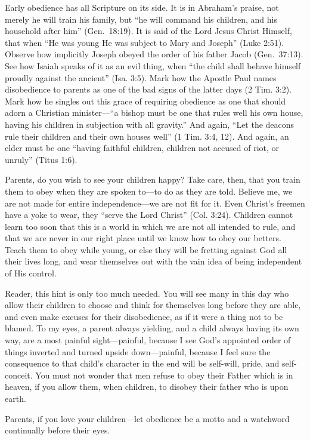 \documentclass[
]{book}
\begin{document}
Early obedience has all Scripture on its side. It is in Abraham's praise, not merely he will train his family, but ``he will command his children, and his household after him'' (Gen.~18:19). It is said of the Lord Jesus Christ Himself, that when ``He was young He was subject to Mary and Joseph'' (Luke 2:51). Observe how implicitly Joseph obeyed the order of his father Jacob (Gen.~37:13). See how Isaiah speaks of it as an evil thing, when ``the child shall behave himself proudly against the ancient'' (Isa. 3:5). Mark how the Apostle Paul names disobedience to parents as one of the bad signs of the latter days (2 Tim. 3:2). Mark how he singles out this grace of requiring obedience as one that should adorn a Christian minister---``a bishop must be one that rules well his own house, having his children in subjection with all gravity.'' And again, ``Let the deacons rule their children and their own houses well'' (1 Tim. 3:4, 12). And again, an elder must be one ``having faithful children, children not accused of riot, or unruly'' (Titus 1:6).

Parents, do you wish to see your children happy? Take care, then, that you train them to obey when they are spoken to---to do as they are told. Believe me, we are not made for entire independence---we are not fit for it. Even Christ's freemen have a yoke to wear, they ``serve the Lord Christ'' (Col. 3:24). Children cannot learn too soon that this is a world in which we are not all intended to rule, and that we are never in our right place until we know how to obey our betters. Teach them to obey while young, or else they will be fretting against God all their lives long, and wear themselves out with the vain idea of being independent of His control.

Reader, this hint is only too much needed. You will see many in this day who allow their children to choose and think for themselves long before they are able, and even make excuses for their disobedience, as if it were a thing not to be blamed. To my eyes, a parent always yielding, and a child always having its own way, are a most painful sight---painful, because I see God's appointed order of things inverted and turned upside down---painful, because I feel sure the consequence to that child's character in the end will be self-will, pride, and self-conceit. You must not wonder that men refuse to obey their Father which is in heaven, if you allow them, when children, to disobey their father who is upon earth.

Parents, if you love your children---let obedience be a motto and a watchword continually before their eyes.
\end{document}
